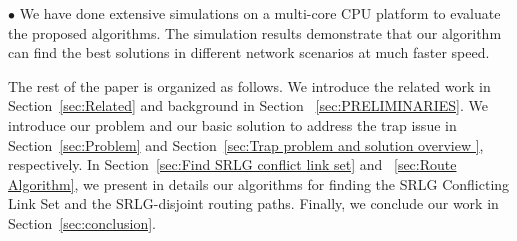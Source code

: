 $\bullet$  We have done extensive simulations on a multi-core CPU platform to evaluate the proposed algorithms. The simulation results demonstrate that our algorithm can find the best solutions in different network scenarios at much faster speed.


The rest of the paper is organized as follows. We introduce the related work in Section~\ref{sec:Related} and background in Section ~\ref{sec:PRELIMINARIES}. We introduce our problem and our basic solution to address the trap issue in Section~\ref{sec:Problem} and Section~\ref{sec:Trap problem and solution overview }, respectively. In Section~\ref{sec:Find SRLG conflict link set} and ~\ref{sec:Route Algorithm}, we present in details our algorithms for finding the SRLG Conflicting Link Set and the SRLG-disjoint routing paths.  Finally, we conclude our work in Section~\ref{sec:conclusion}.







